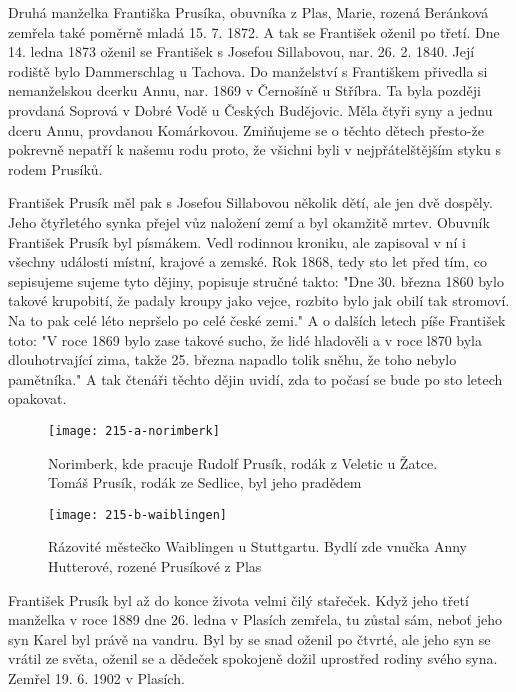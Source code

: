 \documentclass[../dejiny-rodu-prusiku.tex]{subfiles}
\begin{document}
Druhá manželka Františka Prusíka, obuvníka z Plas, Marie, rozená Beránková zemřela také poměrně mladá 15. 7. 1872. A tak se František oženil po třetí. Dne 14. ledna 1873 oženil se František s Josefou Sillabovou, nar. 26. 2. 1840. Její rodiště bylo Dammerschlag u Tachova. Do manželství s Františkem přivedla si nemanželskou dcerku Annu, nar. 1869 v Černošíně u Stříbra. Ta byla později provdaná Soprová v Dobré Vodě u Českých Budějovic. Měla čtyři syny a jednu dceru Annu, provdanou Komárkovou. Zmiňujeme se o těchto dětech přesto-že pokrevně nepatří k našemu rodu proto, že všichni byli v nejpřátelštějším styku s rodem Prusíků.

František Prusík měl pak s Josefou Sillabovou několik dětí, ale jen dvě dospěly. Jeho čtyřletého synka přejel vůz naložení zemí a byl okamžitě mrtev.
Obuvník František Prusík byl písmákem. Vedl rodinnou kroniku, ale zapisoval v ní i všechny události místní, krajové a zemské. Rok 1868, tedy sto let před tím, co sepisujeme
sujeme tyto dějiny, popisuje stručné takto: "Dne 30. března 1860 bylo takové krupobití, že padaly kroupy jako vejce, rozbito bylo jak obilí tak stromoví. Na to pak celé léto nepršelo po celé české zemi." A o dalších letech píše František toto: "V roce 1869 bylo zase takové sucho, že lidé hladověli a v roce l870 byla dlouhotrvající zima, takže 25. března napadlo tolik sněhu, že toho nebylo pamětníka." A tak čtenáři těchto dějin uvidí, zda to počasí se bude po sto letech opakovat.

\begin{figure}
\centering
\texttt{[image: 215-a-norimberk]}
\caption{Norimberk, kde pracuje Rudolf Prusík, rodák z Veletic u Žatce. Tomáš Prusík, rodák ze Sedlice, byl jeho pradědem}
\label{fig:215-a-norimberk}
\end{figure}

\begin{figure}
\centering
\texttt{[image: 215-b-waiblingen]}
\caption{Rázovité městečko Waiblingen u Stuttgartu. Bydlí zde vnučka Anny Hutterové, rozené Prusíkové z Plas}
\label{fig:215-b-waiblingen}
\end{figure}

František Prusík byl až do konce života velmi čilý stařeček. Když jeho třetí manželka v roce 1889 dne 26. ledna v Plasích zemřela, tu zůstal sám, neboť jeho syn Karel byl právě na vandru. Byl by se snad oženil po čtvrté, ale jeho syn se vrátil ze světa, oženil se a dědeček spokojeně dožil uprostřed rodiny svého syna. Zemřel 19. 6. 1902 v Plasích.
\end{document}

